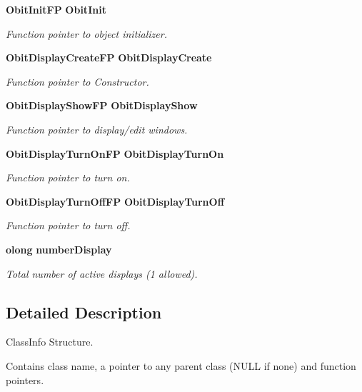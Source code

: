 \begin{CompactItemize}
{\bf Obit\-Init\-FP} {\bf Obit\-Init}
\begin{CompactList}\small\item\em Function pointer to object initializer. \item\end{CompactList}\item 
{\bf Obit\-Display\-Create\-FP} {\bf Obit\-Display\-Create}
\begin{CompactList}\small\item\em Function pointer to Constructor. \item\end{CompactList}\item 
{\bf Obit\-Display\-Show\-FP} {\bf Obit\-Display\-Show}
\begin{CompactList}\small\item\em Function pointer to display/edit windows. \item\end{CompactList}\item 
{\bf Obit\-Display\-Turn\-On\-FP} {\bf Obit\-Display\-Turn\-On}
\begin{CompactList}\small\item\em Function pointer to turn on. \item\end{CompactList}\item 
{\bf Obit\-Display\-Turn\-Off\-FP} {\bf Obit\-Display\-Turn\-Off}
\begin{CompactList}\small\item\em Function pointer to turn off. \item\end{CompactList}\item 
{\bf olong} {\bf number\-Display}
\begin{CompactList}\small\item\em Total number of active displays (1 allowed). \item\end{CompactList}\end{CompactItemize}


\subsection{Detailed Description}
Class\-Info Structure. 

Contains class name, a pointer to any parent class (NULL if none) and function pointers. 



